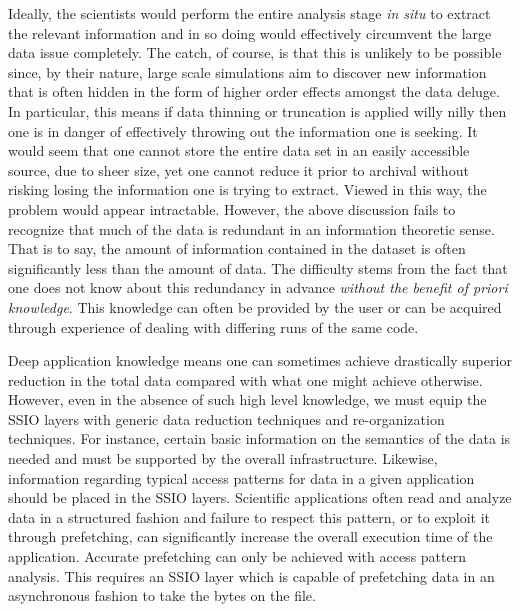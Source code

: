 Ideally, the scientists would perform the entire analysis stage {\em in situ}
to extract the relevant information and in so doing would effectively
circumvent the large data issue completely.  The catch, of course, is that this
is unlikely to be possible since, by their nature, large scale simulations aim
to discover new information that is often hidden in the form of higher order
effects amongst the data deluge. In particular, this means if data thinning or
truncation is applied willy nilly then one is in danger of effectively throwing
out the information one is seeking. It would seem that one cannot store the
entire data set in an easily accessible source, due to sheer size, yet one
cannot reduce it prior to archival without risking losing the information one
is trying to extract.  Viewed in this way, the problem would appear
intractable. However, the above discussion fails to recognize that much of the
data is redundant in an information theoretic sense.  That is to say, the
amount of information contained in the dataset is often significantly less than
the amount of data.  The difficulty stems from the fact that one does not know
about this redundancy in advance \emph{without the benefit of priori
knowledge}. This knowledge can often be provided by the user or can be acquired
through experience of dealing with differing runs of the same code. 

Deep application knowledge means one can sometimes achieve drastically superior
reduction in the total data compared with what one might achieve otherwise.
However, even in the absence of such high level knowledge, we must equip the
SSIO layers with generic data reduction techniques and re-organization
techniques. For instance, certain basic information on the semantics of the
data is needed and must be supported by the overall infrastructure. Likewise,
information regarding typical access patterns for data in a given application
should be placed in the SSIO layers. Scientific applications often read and
analyze data in a structured fashion and failure to respect this pattern, or to
exploit it through prefetching, can significantly increase the overall
execution time of the application. Accurate prefetching can only be achieved
with access pattern analysis. This requires an SSIO layer which is capable of
prefetching data in an asynchronous fashion to take the bytes on the file.

